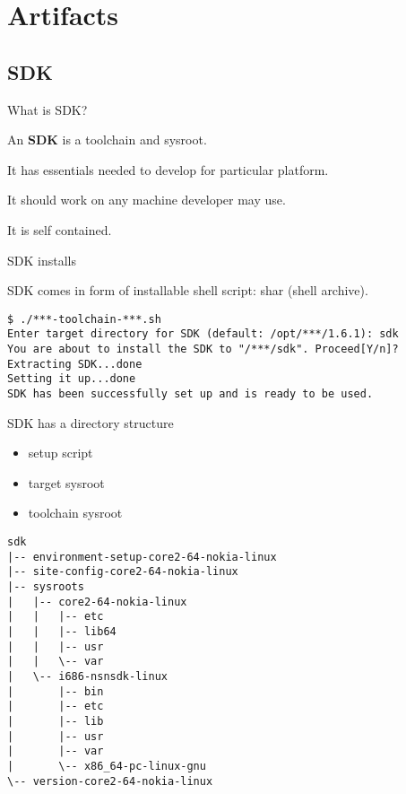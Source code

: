 \documentclass{beamer}
\begin{document}
\section{Artifacts}

\subsection{SDK}

\begin{frame}{What is SDK?}
    \begin{block}{}
        An \textbf{SDK} is a toolchain and sysroot.
    \end{block}
    \begin{block}{}
        It has essentials needed to develop for particular platform.
    \end{block}
    \begin{block}{}
        It should work on any machine developer may use.
    \end{block}
    \begin{block}{}
        It is self contained.
    \end{block}
\end{frame}

\begin{frame}[fragile]{SDK installs}
\begin{block}{}
SDK comes in form of installable shell script: shar
(shell archive).
\end{block}
\begin{lstlisting}[style=Console]
$ ./***-toolchain-***.sh
Enter target directory for SDK (default: /opt/***/1.6.1): sdk
You are about to install the SDK to "/***/sdk". Proceed[Y/n]?
Extracting SDK...done
Setting it up...done
SDK has been successfully set up and is ready to be used.
\end{lstlisting}
\end{frame}

\begin{frame}[fragile]{SDK has a directory structure}
\begin{block}{}
\begin{itemize}
\item{setup script}
\item{target sysroot}
\item{toolchain sysroot}
\end{itemize}
\end{block}
\begin{lstlisting}[style=TinyConsole]
sdk
|-- environment-setup-core2-64-nokia-linux
|-- site-config-core2-64-nokia-linux
|-- sysroots
|   |-- core2-64-nokia-linux
|   |   |-- etc
|   |   |-- lib64
|   |   |-- usr
|   |   \-- var
|   \-- i686-nsnsdk-linux
|       |-- bin
|       |-- etc
|       |-- lib
|       |-- usr
|       |-- var
|       \-- x86_64-pc-linux-gnu
\-- version-core2-64-nokia-linux
\end{lstlisting}
\end{frame}
\end{document}
